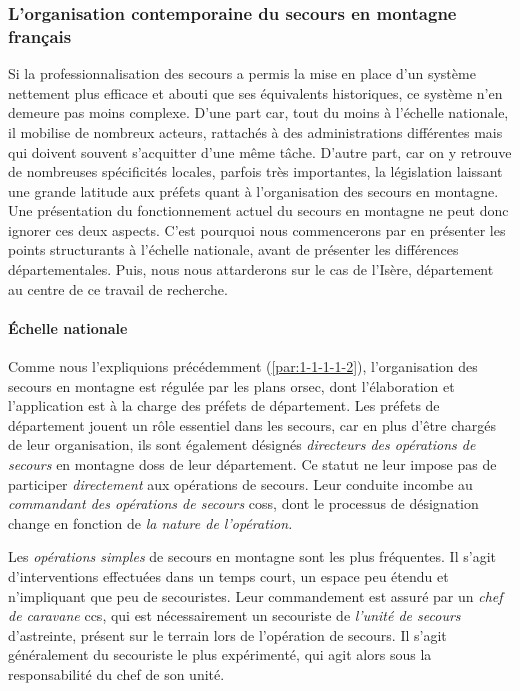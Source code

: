 \subsubsection{L'organisation contemporaine du secours en montagne français}
\label{subsubsec:1-1-1-2}

Si la professionnalisation des secours a permis la mise en place d'un
système nettement plus efficace et abouti que ses équivalents
historiques, ce système n'en demeure pas moins complexe. D'une part
car, tout du moins à l'échelle nationale, il mobilise de nombreux
acteurs, rattachés à des administrations différentes mais qui doivent
souvent s'acquitter d'une même tâche. D'autre part, car on y retrouve
de nombreuses spécificités locales, parfois très importantes, la
législation laissant une grande latitude aux préfets quant à
l'organisation des secours en montagne. Une présentation du
fonctionnement actuel du secours en montagne ne peut donc ignorer ces
deux aspects. C'est pourquoi nous commencerons par en présenter les
points structurants à l'échelle nationale, avant de présenter les
différences départementales. Puis, nous nous attarderons sur le cas de
l'Isère, département au centre de ce travail de recherche.

\paragraph{Échelle nationale}

Comme nous l'expliquions précédemment (\ref{par:1-1-1-1-2}),
l'organisation des secours en montagne est régulée par les plans
\ac{orsec}, dont l'élaboration et l'application est à la charge des
préfets de département. Les préfets de département jouent un rôle
essentiel dans les secours, car en plus d'être chargés de leur
organisation, ils sont également désignés \emph{directeurs des
  opérations de secours} en montagne \acp{dos} de leur département. Ce
statut ne leur impose pas de participer \emph{directement} aux
opérations de secours. Leur conduite incombe au \emph{commandant des
  opérations de secours} \acp{cos}, dont le processus de désignation
change en fonction de \emph{la nature de l'opération.}

Les \emph{opérations simples} de secours en montagne sont les plus
fréquentes. Il s'agit d'interventions effectuées dans un temps court,
un espace peu étendu et n'impliquant que peu de secouristes. Leur
commandement est assuré par un \emph{chef de caravane} \acp{cc}, qui
est nécessairement un secouriste de \emph{l'unité de secours}
d'astreinte, présent sur le terrain lors de l'opération de secours. Il
s'agit généralement du secouriste le plus expérimenté, qui agit alors
sous la responsabilité du chef de son unité.

